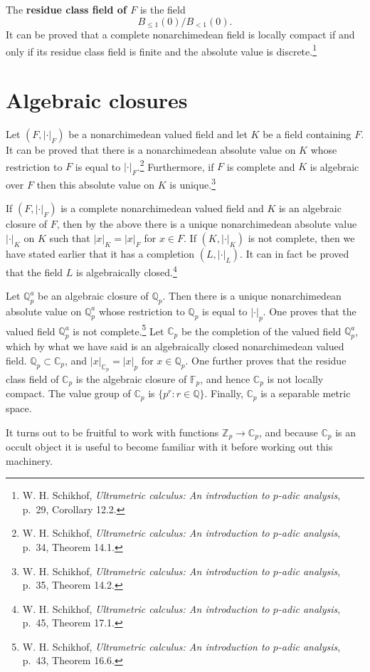 \documentclass{article}
\theoremstyle{definition}
\begin{document}
The \textbf{residue class field of $F$} is the field
\[
B_{\leq 1}(0)/B_{<1}(0).
\]
It can be proved that a complete nonarchimedean field is locally compact if and only if its residue class field is finite and the absolute value is
discrete.\footnote{W. H. Schikhof, {\em Ultrametric calculus: An introduction to $p$-adic analysis}, p.~29, Corollary 12.2.}


\section{Algebraic closures}
Let $(F,|\cdot|_F)$ be a nonarchimedean valued field and let $K$ be a field containing $F$. 
It can be proved that there is a nonarchimedean absolute value on $K$ whose restriction to $F$ is equal to
$|\cdot|_F$.\footnote{W. H. Schikhof, {\em Ultrametric calculus: An introduction to $p$-adic analysis}, p.~34, Theorem 14.1.}
Furthermore, if $F$ is complete and $K$ is algebraic over $F$ then this absolute value on $K$ is
unique.\footnote{W. H. Schikhof, {\em Ultrametric calculus: An introduction to $p$-adic analysis}, p.~35, Theorem 14.2.}

If $(F,|\cdot|_F)$ is a complete nonarchimedean valued field and $K$ is an algebraic closure of $F$, then by the above
there is a unique nonarchimedean absolute value $|\cdot|_K$ on $K$ such that $|x|_K=|x|_F$ for $x \in F$.
If $(K,|\cdot|_K)$ is not complete,
then we have stated earlier that it has a completion $(L,|\cdot|_L)$. 
It can in fact be proved that the field $L$ is algebraically closed.\footnote{W. H. Schikhof, {\em Ultrametric calculus: An introduction to $p$-adic analysis}, p.~45, Theorem 17.1.}


Let $\mathbb{Q}_p^a$ be an algebraic closure of $\mathbb{Q}_p$. Then there is a unique nonarchimedean absolute value on $\mathbb{Q}_p^a$ whose
restriction to $\mathbb{Q}_p$ is equal to $|\cdot|_p$. 
One proves that the valued field $\mathbb{Q}_p^a$ is not
complete.\footnote{W. H. Schikhof, {\em Ultrametric calculus: An introduction to $p$-adic analysis}, p.~43, Theorem 16.6.}
Let $\mathbb{C}_p$ be the completion of the valued field $\mathbb{Q}_p^a$, which by what we have said is
an algebraically closed nonarchimedean valued field. $\mathbb{Q}_p \subset \mathbb{C}_p$,
and  $|x|_{\mathbb{C}_p} = |x|_p$ for $x \in \mathbb{Q}_p$. 
One further proves that the residue class field of $\mathbb{C}_p$ is the algebraic closure of $\mathbb{F}_p$, and hence
$\mathbb{C}_p$ is not locally compact.  The value group of $\mathbb{C}_p$ is $\{p^r: r \in \mathbb{Q}\}$. Finally, $\mathbb{C}_p$ is a separable metric
space.

It turns out to be fruitful to work with functions $\mathbb{Z}_p \to \mathbb{C}_p$, and because $\mathbb{C}_p$ is an occult object it is useful to 
become familiar with it before working out this machinery.
\end{document}
